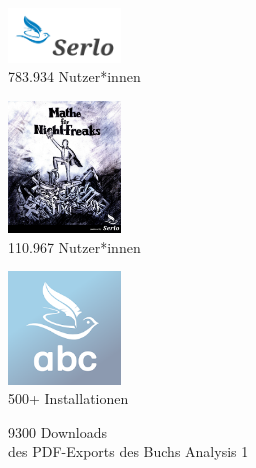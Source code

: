 \documentclass[aspectratio=169]{beamer}
\begin{document}
\begin{frame}
    \vfill

    \begin{minipage}[b]{0.3\textwidth}
        \centering
        \includegraphics[width=3cm]{serlo-logo.png}
        \\[0.5em]
        783.934 Nutzer*innen\footnotemark[1]
    \end{minipage}
    \hfill
    \begin{minipage}[b]{0.3\textwidth}
        \centering
        \includegraphics[width=3cm]{mfnf-logo.jpg}
        \\[0.5em]
        110.967 Nutzer*innen\footnotemark[1]
    \end{minipage}
    \hfill
    \begin{minipage}[b]{0.3\textwidth}
        \centering
        \includegraphics[width=3cm]{serlo-abc-logo.png}
        \\[0.5em]
        500+ Installationen\footnotemark[1]
    \end{minipage}

    \begin{center}
        9300 Downloads \\ des PDF-Exports des Buchs Analysis 1
    \end{center}

\end{frame}
\end{document}
